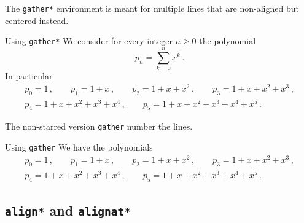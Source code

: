 The \texttt{gather*} environment is meant for multiple lines that are non-aligned but centered instead.
\begin{showlatex}{Using \texttt{gather*}}
We consider for every integer $n \geq 0$ the polynomial
\[
  p_n
  =
  \sum_{k=0}^n x^k \,.
\]
In particular
\begin{gather*}
  p_0 = 1 \,,
  \qquad
  p_1 = 1 + x \,,
  \qquad
  p_2 = 1 + x + x^2 \,,
  \qquad
  p_3 = 1 + x + x^2 + x^3 \,,
  \\
  p_4 = 1 + x + x^2 + x^3 + x^4 \,,
  \qquad
  p_5 = 1 + x + x^2 + x^3 + x^4 + x^5 \,.
\end{gather*}
\end{showlatex}
The non-starred version \texttt{gather} number the lines.
\begin{showlatex}{Using \texttt{gather}}
We have the polynomials
\begin{gather}
  p_0 = 1 \,,
  \qquad
  p_1 = 1 + x \,,
  \qquad
  p_2 = 1 + x + x^2 \,,
  \qquad
  p_3 = 1 + x + x^2 + x^3 \,,
  \\
  p_4 = 1 + x + x^2 + x^3 + x^4 \,,
  \qquad
  p_5 = 1 + x + x^2 + x^3 + x^4 + x^5 \,.
\end{gather}
\end{showlatex}



\subsection{\texttt{align*} and \texttt{alignat*}}

